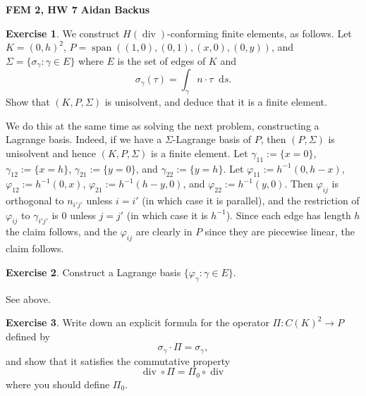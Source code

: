 \documentclass[10pt]{article}
\newcommand*\dif{\mathop{}\!\mathrm{d}}
\newcommand{\spn}{\operatorname{span}}
\DeclareMathOperator{\Div}{div}
\theoremstyle{definition}
\newtheorem{exer}{Exercise}
\begin{document}
\noindent
\large\textbf{FEM 2, HW 7} \hfill \textbf{Aidan Backus} \\

\begin{exer}
    We construct $H(\Div)$-conforming finite elements, as follows. Let $K = (0, h)^2$, $P = \spn((1, 0), (0, 1), (x, 0), (0, y))$, and $\Sigma = \{\sigma_\gamma: \gamma \in E\}$ where $E$ is the set of edges of $K$ and
    $$\sigma_\gamma(\tau) = \int_\gamma n \cdot \tau \dif s.$$
    Show that $(K, P, \Sigma)$ is unisolvent, and deduce that it is a finite element.
\end{exer}

    We do this at the same time as solving the next problem, constructing a Lagrange basis.
    Indeed, if we have a $\Sigma$-Lagrange basis of $P$, then $(P, \Sigma)$ is unisolvent and hence $(K, P, \Sigma)$ is a finite element.
    Let $\gamma_{11} := \{x = 0\}$, $\gamma_{12} := \{x = h\}$, $\gamma_{21} := \{y = 0\}$, and $\gamma_{22} := \{y = h\}$.
    Let $\varphi_{11} := h^{-1} (0, h - x)$, $\varphi_{12} := h^{-1} (0, x)$, $\varphi_{21} := h^{-1} (h - y, 0)$, and $\varphi_{22} := h^{-1} (y, 0)$.
    Then $\varphi_{ij}$ is orthogonal to $n_{i'j'}$ unless $i = i'$ (in which case it is parallel), and the restriction of $\varphi_{ij}$ to $\gamma_{i'j'}$ is $0$ unless $j = j'$ (in which case it is $h^{-1}$).
    Since each edge has length $h$ the claim follows, and the $\varphi_{ij}$ are clearly in $P$ since they are piecewise linear, the claim follows.

\begin{exer}
    Construct a Lagrange basis $\{\varphi_\gamma: \gamma \in E\}$.
\end{exer}

    See above.

\begin{exer}
    Write down an explicit formula for the operator $\Pi: C(K)^2 \to P$ defined by 
\begin{equation}\label{orthoprojection}
    \sigma_\gamma \cdot \Pi = \sigma_\gamma,
\end{equation}
    and show that it satisfies the commutative property 
\begin{equation}\label{commuting}
    \Div \circ \Pi = \Pi_0 \circ \Div
\end{equation}
    where you should define $\Pi_0$.
\end{exer}
\end{document}
